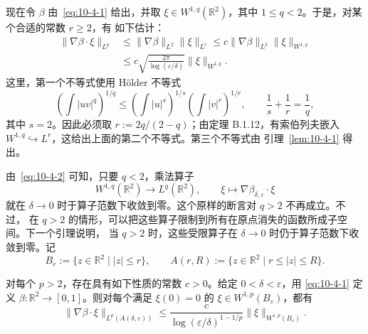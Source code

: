 现在令 $\beta$ 由~\eqref{eq:10-4-1} 给出，并取
$\xi\in W^{1,q}(\mathbb R^2)$，其中 $1\le q<2$。于是，对某个合适的常数 $r\ge2$，有
如下估计：
\begin{equation}\label{eq:10-4-2}
  \begin{aligned}
  \|\nabla\beta\cdot\xi\|_{L^q}
  &\le\|\nabla\beta\|_{L^2}\|\xi\|_{L^r}
   \le c\|\nabla\beta\|_{L^2}\|\xi\|_{W^{1,q}}\\
  &\le c\sqrt{\frac{2\pi}{\log(\varepsilon/\delta)}}
  \|\xi\|_{W^{1,q}}.
  \end{aligned}
\end{equation}
这里，第一个不等式使用 Hölder 不等式
\[
  \left(\int|uv|^q\right)^{1/q}
  \le
  \left(\int|u|^s\right)^{1/s}
  \left(\int|v|^r\right)^{1/r},
  \qquad
  \frac1s+\frac1r=\frac1q,
\]
其中 $s=2$。因此必须取 $r:=2q/(2-q)$；由定理 B.1.12，有索伯列夫嵌入
$W^{1,q}\hookrightarrow L^r$，这给出上面的第二个不等式。第三个不等式由
引理~\ref{lem:10-4-1} 得出。

由~\eqref{eq:10-4-2} 可知，只要 $q<2$，乘法算子
\[
  W^{1,q}(\mathbb R^2)\longrightarrow L^q(\mathbb R^2),
  \qquad \xi\longmapsto\nabla\beta_{\delta,\varepsilon}\cdot\xi
\]
就在 $\delta\to0$ 时于算子范数下收敛到零。这个原样的断言对 $q>2$ 不再成立。不过，
在 $q>2$ 的情形，可以把这些算子限制到所有在原点消失的函数所成子空间。下一个引理说明，
当 $q>2$ 时，这些受限算子在 $\delta\to0$ 时仍于算子范数下收敛到零。记
\[
  B_r:=\{z\in\mathbb R^2\mid |z|\le r\},
  \qquad
  A(r,R):=\{z\in\mathbb R^2\mid r\le|z|\le R\}.
\]

\begin{lemma}\label{lem:10-4-2}
对每个 $p>2$，存在具有如下性质的常数 $c>0$。给定 $0<\delta<\varepsilon$，用
\eqref{eq:10-4-1} 定义 $\beta:\mathbb R^2\to[0,1]$。则对每个满足
$\xi(0)=0$ 的 $\xi\in W^{1,p}(B_\varepsilon)$，都有
\[
  \|\nabla\beta\cdot\xi\|_{L^p(A(\delta,\varepsilon))}
  \le
  \frac{c}{\log(\varepsilon/\delta)^{1-1/p}}
  \|\xi\|_{W^{1,p}(B_\varepsilon)}.
\]
\end{lemma}

